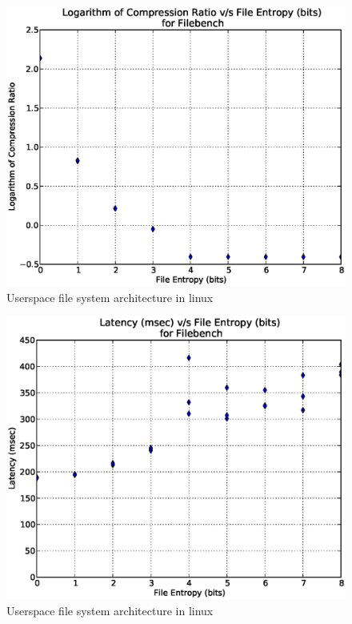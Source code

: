 \begin{figure}
\label{fig:fuse}
\begin{center}
\includegraphics[scale=.55]{../results/write_comp_all.eps}
\caption{Userspace file system architecture in linux\cite{web:wiki-fuse}}
\end{center}
\end{figure}


\begin{figure}
\label{fig:fuse}
\begin{center}
\includegraphics[scale=.55]{../results/write_latency_all.eps}
\caption{Userspace file system architecture in linux\cite{web:wiki-fuse}}
\end{center}
\end{figure}


